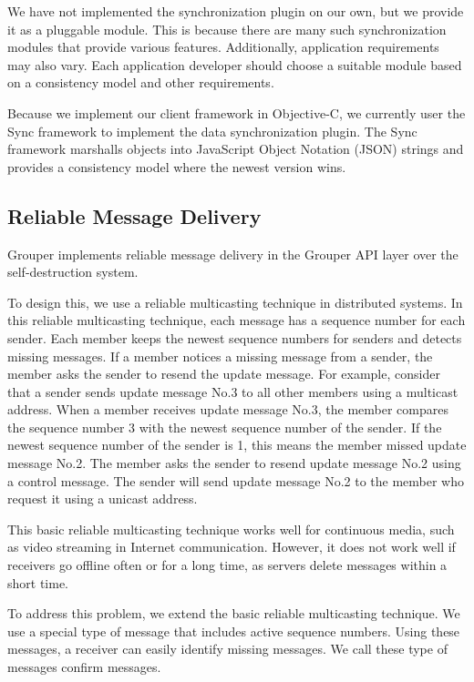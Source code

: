 \documentclass{sig-alternate-05-2015}
\begin{document}
We have not implemented the synchronization plugin on our own, but we provide it as a pluggable module.
This is because there are many such synchronization modules that provide various features.
Additionally, application requirements may also vary.
Each application developer should choose a suitable module based on a consistency model and other requirements.

Because we implement our client framework in Objective-C, we currently user the Sync framework\cite{sync} to implement the data synchronization plugin.
The Sync framework marshalls objects into JavaScript Object Notation (JSON) strings and provides a consistency model where the newest version wins.

\subsection{Reliable Message Delivery}

Grouper implements reliable message delivery in the Grouper API layer over the self-destruction system.

To design this, we use a reliable multicasting technique in distributed systems\cite{tanenbaum2007distributed}.
In this reliable multicasting technique, each message has a sequence number for each sender.
Each member keeps the newest sequence numbers for senders and detects missing messages.
If a member notices a missing message from a sender, the member asks the sender to resend the update message.
For example, consider that a sender sends update message No.3 to all other members using a multicast address.
When a member receives update message No.3, the member compares the sequence number 3 with the newest sequence number of the sender.
If the newest sequence number of the sender is 1, this means the member missed update message No.2.
The member asks the sender to resend update message No.2 using a control message.
The sender will send update message No.2 to the member who request it using a unicast address.

This basic reliable multicasting technique works well for continuous media, such as video streaming in Internet communication.
However, it does not work well if receivers go offline often or for a long time, as servers delete messages within a short time.

To address this problem, we extend the basic reliable multicasting technique.
We use a special type of message that includes active sequence numbers.
Using these messages, a receiver can easily identify missing messages.
We call these type of messages confirm messages.
\end{document}
